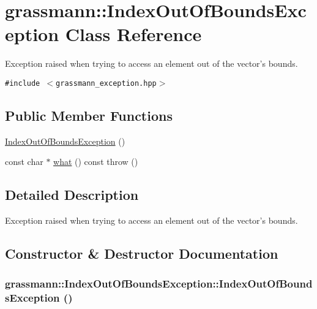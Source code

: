 \hypertarget{classgrassmann_1_1IndexOutOfBoundsException}{
\section{grassmann::IndexOutOfBoundsException Class Reference}
\label{classgrassmann_1_1IndexOutOfBoundsException}
}
Exception raised when trying to access an element out of the vector's bounds.  


{\tt \#include $<$grassmann\_\-exception.hpp$>$}

\subsection*{Public Member Functions}
\begin{CompactItemize}
\item 
\hyperlink{classgrassmann_1_1IndexOutOfBoundsException_0333d231d44e23620c6d58b238cc2781}{IndexOutOfBoundsException} ()
\item 
const char $\ast$ \hyperlink{classgrassmann_1_1IndexOutOfBoundsException_f81e056b32b7cae21a5fd7232ee7b9c8}{what} () const   throw ()
\end{CompactItemize}


\subsection{Detailed Description}
Exception raised when trying to access an element out of the vector's bounds. 

\subsection{Constructor \& Destructor Documentation}
\hypertarget{classgrassmann_1_1IndexOutOfBoundsException_0333d231d44e23620c6d58b238cc2781}{
\subsubsection[IndexOutOfBoundsException]{\setlength{\rightskip}{0pt plus 5cm}grassmann::IndexOutOfBoundsException::IndexOutOfBoundsException ()}}
\label{classgrassmann_1_1IndexOutOfBoundsException_0333d231d44e23620c6d58b238cc2781}




